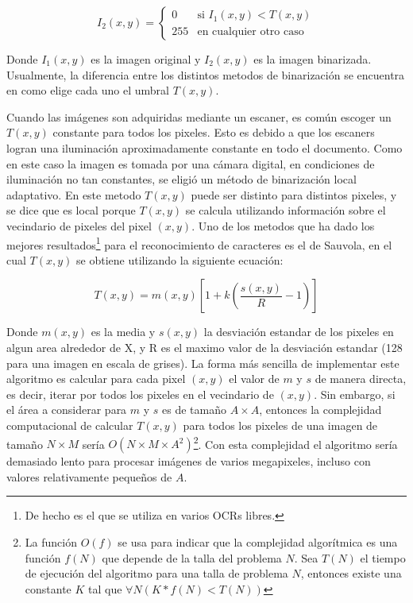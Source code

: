 \documentclass[a4paper, 11pt, oneside]{report}
\begin{document}
\begin{equation}\label{binEq}
	I_2(x,y) = \left\{ \begin{array}{ll}
		0   & \mbox{si $I_1(x,y) < T(x,y)$} \\
		255 & \mbox{en cualquier otro caso}
	\end{array} \right. 
\end{equation}

Donde $I_1(x,y)$ es la imagen original y $I_2(x,y)$ es la imagen binarizada. Usualmente, la diferencia entre los distintos metodos de binarización se encuentra en como elige cada uno el umbral $T(x,y)$.

Cuando las imágenes son adquiridas mediante un escaner, es común escoger un $T(x,y)$ constante para todos los pixeles. Esto es debido a que los escaners logran una iluminación aproximadamente constante en todo el documento. Como en este caso la imagen es tomada por una cámara digital, en condiciones de iluminación no tan constantes, se eligió un método de binarización local adaptativo. En este metodo $T(x,y)$ puede ser distinto para distintos pixeles, y se dice que es local porque $T(x,y)$ se calcula utilizando información sobre el vecindario de pixeles del pixel $(x,y)$. Uno de los metodos que ha dado los mejores resultados\footnote{De hecho es el que se utiliza en varios OCRs libres.} para el reconocimiento de caracteres es el de Sauvola, en el cual $T(x,y)$ se obtiene utilizando la siguiente ecuación:

\begin{equation}\label{rSauvola}
	T(x,y)=m(x,y)\left[ 1 + k(\frac{s(x,y)}{R}-1) \right]
\end{equation}

Donde $m(x,y)$ es la media y $s(x,y)$ la desviación estandar de los pixeles en algun area alrededor de X, y R es el maximo valor de la desviación estandar (128 para una imagen en escala de grises). La forma más sencilla de implementar este algoritmo es calcular para cada pixel $(x,y)$ el valor de $m$ y $s$ de manera directa, es decir, iterar por todos los pixeles en el vecindario de $(x,y)$. Sin embargo, si el área a considerar para $m$ y $s$ es de tamaño $A \times A$, entonces la complejidad computacional de calcular $T(x,y)$ para todos los pixeles de una imagen de tamaño $N \times M$ sería $O(N \times M \times A^{2})$\footnote{La función $O(f)$ se usa para indicar que la complejidad algorítmica es una función $f(N)$ que depende de la talla del problema $N$. Sea $T(N)$ el tiempo de  ejecución del algoritmo para una talla de problema $N$, entonces existe una constante $K$ tal que  $\forall N ( K*f(N) < T(N) ) $}. Con esta complejidad el algoritmo sería demasiado lento para procesar imágenes de varios megapixeles, incluso con valores relativamente pequeños de $A$.
\end{document}
